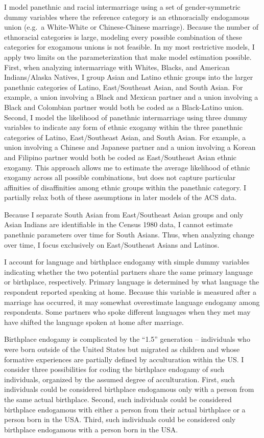 \documentclass[11pt,]{article}
\begin{document}
I model panethnic and racial intermarriage using a set of gender-symmetric dummy variables where the reference category is an ethnoracially endogamous union (e.g.~a White-White or Chinese-Chinese marriage). Because the number of ethnoracial categories is large, modeling every possible combination of these categories for exogamous unions is not feasible. In my most restrictive models, I apply two limits on the parameterization that make model estimation possible. First, when analyzing intermarriage with Whites, Blacks, and American Indians/Alaska Natives, I group Asian and Latino ethnic groups into the larger panethnic categories of Latino, East/Southeast Asian, and South Asian. For example, a union involving a Black and Mexican partner and a union involving a Black and Colombian partner would both be coded as a Black-Latino union. Second, I model the likelihood of panethnic intermarriage using three dummy variables to indicate any form of ethnic exogamy within the three panethnic categories of Latino, East/Southeast Asian, and South Asian. For example, a union involving a Chinese and Japanese partner and a union involving a Korean and Filipino partner would both be coded as East/Southeast Asian ethnic exogamy. This approach allows me to estimate the average likelihood of ethnic exogamy across all possible combinations, but does not capture particular affinities of disaffinities among ethnic groups within the panethnic category. I partially relax both of these assumptions in later models of the ACS data.

Because I separate South Asian from East/Southeast Asian groups and only Asian Indians are identifiable in the Census 1980 data, I cannot estimate panethnic parameters over time for South Asians. Thus, when analyzing change over time, I focus exclusively on East/Southeast Asians and Latinos.

I account for language and birthplace endogamy with simple dummy variables indicating whether the two potential partners share the same primary language or birthplace, respectively. Primary language is determined by what language the respondent reported speaking at home. Because this variable is measured after a marriage has occurred, it may somewhat overestimate language endogamy among respondents. Some partners who spoke different languages when they met may have shifted the language spoken at home after marriage.

Birthplace endogamy is complicated by the ``1.5'' generation -- individuals who were born outside of the United States but migrated as children and whose formative experiences are partially defined by acculturation within the US. I consider three possibilities for coding the birthplace endogamy of such individuals, organized by the assumed degree of acculturation. First, such individuals could be considered birthplace endogamous only with a person from the same actual birthplace. Second, such individuals could be considered birthplace endogamous with either a person from their actual birthplace or a person born in the USA. Third, such individuals could be considered only birthplace endogamous with a person born in the USA.
\end{document}
